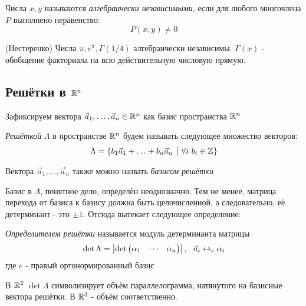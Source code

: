 \begin{definition}
	Числа $x, y$ называются \textit{алгебраически независимыми}, если для любого многочлена $P$ выполнено неравенство:
	\[
		P(x, y) \neq 0
	\]
\end{definition}

\begin{theorem} (Нестеренко)
	Числа $\pi, e^\pi, \Gamma(1/4)$ алгебраически независимы. $\Gamma(x)$ - обобщение факториала на всю действительную числовую прямую.
\end{theorem}

\subsection{Решётки в $\mathbb{R}^n$}

\begin{note}
	Зафиксируем вектора $\vec{a}_1, \ldots, \vec{a}_n \in \mathbb{R}^n$ как базис пространства $\mathbb{R}^n$
\end{note}

\begin{definition}
	\textit{Решёткой} $\Lambda$ в пространстве $\mathbb{R}^n$ будем называть следующее множество векторов:
	\[
		\Lambda = \{b_1\vec{a}_1 + \ldots + b_n\vec{a}_n \ \big|\  \forall i\ b_i \in \mathbb{Z}\}
	\]
\end{definition}

\begin{definition}
	Вектора $\vec{a}_1, \ldots, \vec{a}_n$ также можно назвать \textit{базисом решётки}
\end{definition}

\begin{note}
	Базис в $\Lambda$, понятное дело, определён неоднозначно. Тем не менее, матрица перехода от базиса к базису должна быть целочисленной, а следовательно, её детерминант - это $\pm 1$. Отсюда вытекает следующее определение:
\end{note}

\begin{definition}
	\textit{Определителем решётки} называется модуль детерминанта матрицы
	\[
		\det \Lambda = \left|\det \left(\begin{aligned}\alpha_1 & &\cdots & &\alpha_n\end{aligned}\right)\right|,\ \ \vec{a}_i \leftrightarrow_e \alpha_i
	\]
	где $e$ - правый ортонормированный базис
\end{definition}

\begin{note}
	В $\mathbb{R}^2$ $\det \Lambda$ символизирует объём параллелограмма, натянутого на базисные вектора решётки. В $\mathbb{R}^3$ - объём соответственно.
\end{note}

